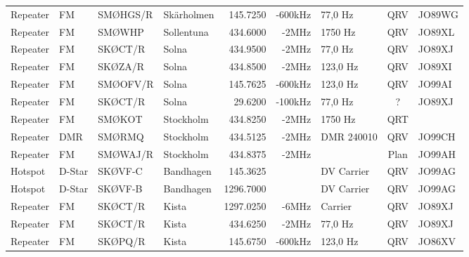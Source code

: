 \begin{landscape}
\begin{longtable}{llllrrlcl}
	Repeater           & FM           & SMØHGS/R      & Skärholmen   &          145.7250 &        -600kHz & 77,0 Hz         &       QRV       & JO89WG           \\
	Repeater           & FM           & SMØWHP        & Sollentuna   &          434.6000 &          -2MHz & 1750 Hz         &       QRV       & JO89XL           \\
	Repeater           & FM           & SKØCT/R       & Solna        &          434.9500 &          -2MHz & 77,0 Hz         &       QRV       & JO89XJ           \\
	Repeater           & FM           & SKØZA/R       & Solna        &          434.8500 &          -2MHz & 123,0 Hz        &       QRV       & JO89XI           \\
	Repeater           & FM           & SMØOFV/R      & Solna        &          145.7625 &        -600kHz & 123,0 Hz        &       QRV       & JO99AI           \\
	Repeater           & FM           & SKØCT/R       & Solna        &           29.6200 &        -100kHz & 77,0 Hz         &        ?        & JO89XJ           \\
	Repeater           & FM           & SMØKOT        & Stockholm    &          434.8250 &          -2MHz & 1750 Hz         &       QRT       &  \\
	Repeater           & DMR          & SMØRMQ        & Stockholm    &          434.5125 &          -2MHz & DMR 240010      &       QRV       & JO99CH           \\
	Repeater           & FM           & SMØWAJ/R      & Stockholm    &          434.8375 &          -2MHz &                 &      Plan       & JO99AH           \\
	Hotspot            & D-Star       & SKØVF-C       & Bandhagen    &          145.3625 &                & DV Carrier      &       QRV       & JO99AG           \\
	Hotspot            & D-Star       & SKØVF-B       & Bandhagen    &         1296.7000 &                & DV Carrier      &       QRV       & JO99AG           \\
	Repeater           & FM           & SKØCT/R       & Kista        &         1297.0250 &          -6MHz & Carrier         &       QRV       & JO89XJ           \\
	Repeater           & FM           & SKØCT/R       & Kista        &          434.6250 &          -2MHz & 77,0 Hz         &       QRV       & JO89XJ           \\
	Repeater           & FM           & SKØPQ/R       & Kista        &          145.6750 &        -600kHz & 123,0 Hz        &       QRV       & JO86XV           \\

\end{longtable}
\end{landscape}
